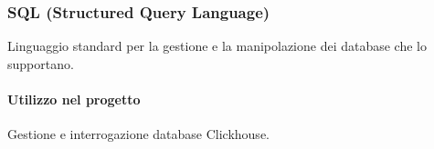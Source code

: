 \subsubsection{SQL (Structured Query Language)}
Linguaggio standard per la gestione e la manipolazione dei
database che lo supportano. 

\paragraph{Utilizzo nel progetto}
Gestione e interrogazione database Clickhouse.

